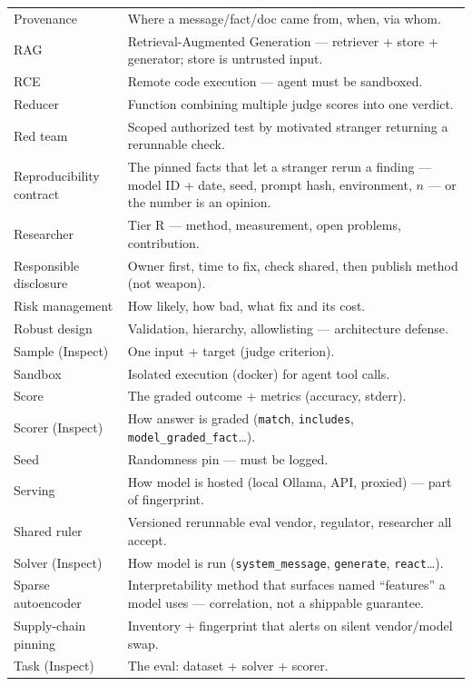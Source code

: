 \begin{center}
\begin{tabularx}{\linewidth}{lX}
Provenance & Where a message/fact/doc came from, when, via whom. \\
RAG & Retrieval-Augmented Generation — retriever + store + generator; store is untrusted input. \\
RCE & Remote code execution — agent must be sandboxed. \\
Reducer & Function combining multiple judge scores into one verdict. \\
Red team & Scoped authorized test by motivated stranger returning a rerunnable check. \\
Reproducibility contract & The pinned facts that let a stranger rerun a finding — model ID + date, seed, prompt hash, environment, $n$ — or the number is an opinion. \\
Researcher & Tier R — method, measurement, open problems, contribution. \\
Responsible disclosure & Owner first, time to fix, check shared, then publish method (not weapon). \\
Risk management & How likely, how bad, what fix and its cost. \\
Robust design & Validation, hierarchy, allowlisting — architecture defense. \\
Sample (Inspect) & One input + target (judge criterion). \\
Sandbox & Isolated execution (docker) for agent tool calls. \\
Score & The graded outcome + metrics (accuracy, stderr). \\
Scorer (Inspect) & How answer is graded (\texttt{match}, \texttt{includes}, \texttt{model\_graded\_fact}…). \\
Seed & Randomness pin — must be logged. \\
Serving & How model is hosted (local Ollama, API, proxied) — part of fingerprint. \\
Shared ruler & Versioned rerunnable eval vendor, regulator, researcher all accept. \\
Solver (Inspect) & How model is run (\texttt{system\_message}, \texttt{generate}, \texttt{react}…). \\
Sparse autoencoder & Interpretability method that surfaces named ``features'' a model uses — correlation, not a shippable guarantee. \\
Supply-chain pinning & Inventory + fingerprint that alerts on silent vendor/model swap. \\
Task (Inspect) & The eval: dataset + solver + scorer. \\

\end{tabularx}
\end{center}
